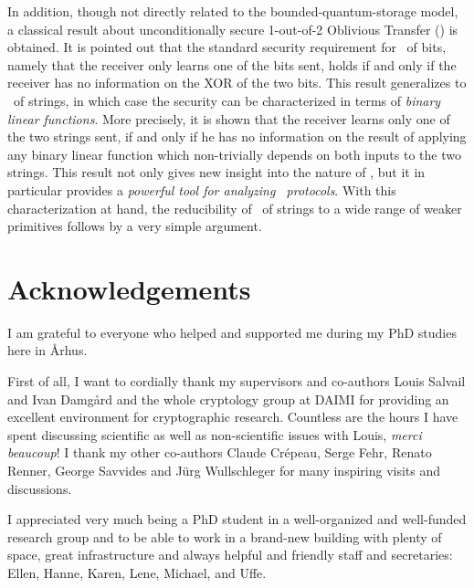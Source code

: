 \vspace{2mm} In addition, though not directly related to the
bounded-quantum-storage model, a classical result about
unconditionally secure 1-out-of-2 Oblivious Transfer (\OT) is
obtained. It is pointed out that the standard security requirement for
\OT\ of bits, namely that the receiver only learns one of the bits
sent, holds if and only if the receiver has no information on the XOR
of the two bits. This result generalizes to \OT\ of strings, in which
case the security can be characterized in terms of \emph{binary linear
  functions}.  More precisely, it is shown that the receiver learns
only one of the two strings sent, if and only if he has no information
on the result of applying any binary linear function which
non-trivially depends on both inputs to the two strings. This result
not only gives new insight into the nature of \OT, but it in
particular provides a \emph{powerful tool for analyzing \OT\ 
  protocols}. With this characterization at hand, the reducibility of
\OT\ of strings to a wide range of weaker primitives follows by a very
simple argument.




\clearemptydoublepage
{}
{}
\chapter*{{\Huge Acknowledgements}}

I am grateful to everyone who helped and supported me during my PhD
studies here in {\AA}rhus. 

First of all, I want to cordially thank my supervisors and co-authors
Louis Salvail and Ivan Damg{\aa}rd and the whole cryptology group at
DAIMI for providing an excellent environment for cryptographic
research. Countless are the hours I have spent discussing scientific
as well as non-scientific issues with Louis, \emph{merci beaucoup}! I
thank my other co-authors Claude Cr\'epeau, Serge Fehr, Renato Renner,
George Savvides and J\"urg Wullschleger for many inspiring visits and
discussions.

I appreciated very much being a PhD student in a well-organized and
well-funded research group and to be able to work in a brand-new building
with plenty of space, great infrastructure and always helpful and
friendly staff and secretaries: Ellen, Hanne, Karen, Lene,
Michael, and Uffe.

